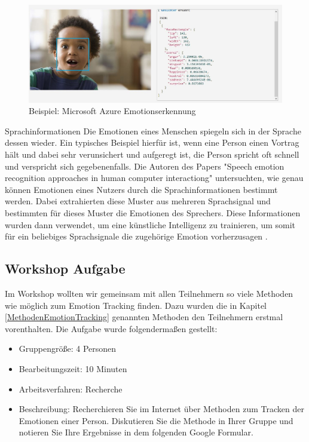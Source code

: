 \begin{figure}[!h]
	\centering
	\includegraphics[width=0.9\linewidth]{Pictures/Microsoft_Gestenerkennung}
	\caption[Beispiel: Microsoft Azure Emotionserkennung]{Beispiel: Microsoft Azure Emotionserkennung \cite{MicrosoftAzure}}
	\label{fig:microsoftgestenerkennung}
\end{figure}

Sprachinformationen
Die Emotionen eines Menschen spiegeln sich in der Sprache dessen wieder. Ein typisches Beispiel hierfür ist, wenn eine Person einen Vortrag hält und dabei sehr verunsichert und aufgeregt ist, die Person spricht oft schnell und verspricht sich gegebenenfalls. Die Autoren des Papers "Speech emotion recognition approaches in human computer interactiong" untersuchten, wie genau können Emotionen eines Nutzers durch die Sprachinformationen bestimmt werden. Dabei extrahierten diese Muster aus mehreren Sprachsignal und bestimmten für dieses Muster die Emotionen des Sprechers. Diese Informationen wurden dann verwendet, um eine künstliche Intelligenz zu trainieren, um somit für ein beliebiges Sprachsignale die zugehörige Emotion vorherzusagen \cite{SpeechInformation}.


\subsection{Workshop Aufgabe}
Im Workshop wollten wir gemeinsam mit allen Teilnehmern so viele Methoden wie möglich zum Emotion Tracking finden. Dazu wurden die in Kapitel \ref{MethodenEmotionTracking} genannten Methoden den Teilnehmern erstmal vorenthalten. Die Aufgabe wurde folgendermaßen gestellt:

\begin{itemize}
	\item Gruppengröße: 4 Personen
	\item Bearbeitungszeit: 10 Minuten
	\item Arbeitsverfahren: Recherche
	\item Beschreibung: Recherchieren Sie im Internet über Methoden zum Tracken der Emotionen einer Person. Diskutieren Sie die Methode in Ihrer Gruppe und notieren Sie Ihre Ergebnisse in dem folgenden Google Formular.
\end{itemize}

